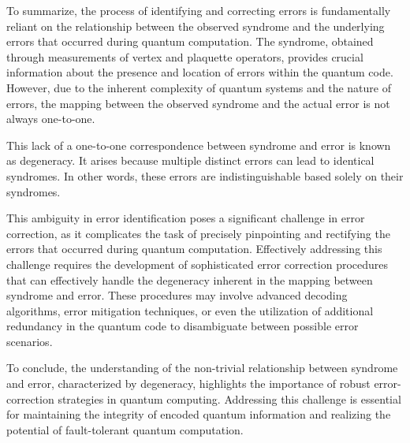 \documentclass{Configuration_Files/PoliMi3i_thesis}
\begin{document}

To summarize, the process of identifying and correcting errors is fundamentally reliant on the relationship between the observed syndrome and the underlying errors that occurred during quantum computation. 
The syndrome, obtained through measurements of vertex and plaquette operators, provides crucial information about the presence and location of errors within the quantum code. However, due to the inherent complexity of quantum systems and the nature of errors, the mapping between the observed syndrome and the actual error is not always one-to-one. \newline

This lack of a one-to-one correspondence between syndrome and error is known as degeneracy. It arises because multiple distinct errors can lead to identical syndromes. In other words, these errors are indistinguishable based solely on their syndromes. \newline


This ambiguity in error identification poses a significant challenge in error correction, as it complicates the task of precisely pinpointing and rectifying the errors that occurred during quantum computation. Effectively addressing this challenge requires the development of sophisticated error correction procedures that can effectively handle the degeneracy inherent in the mapping between syndrome and error. These procedures may involve advanced decoding algorithms, error mitigation techniques, or even the utilization of additional redundancy in the quantum code to disambiguate between possible error scenarios. \newline

To conclude, the understanding of the non-trivial relationship between syndrome and error, characterized by degeneracy, highlights the importance of robust error-correction strategies in quantum computing. Addressing this challenge is essential for maintaining the integrity of encoded quantum information and realizing the potential of fault-tolerant quantum computation. \newline
\end{document}
